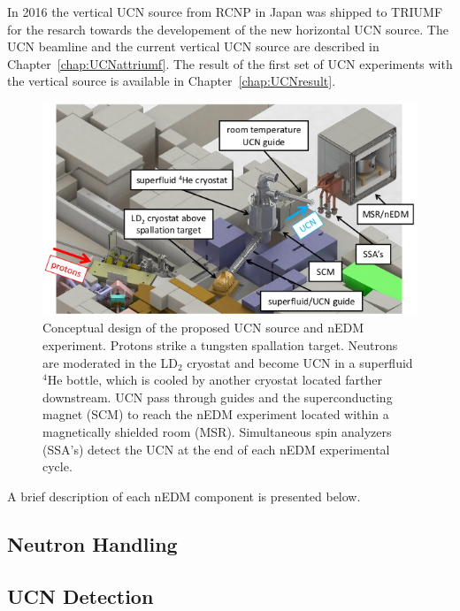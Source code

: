 In 2016 the vertical UCN source from RCNP in Japan was shipped to TRIUMF for
the resarch towards the developement of the new horizontal UCN source.
The UCN beamline and the current vertical UCN source
are described in Chapter~\ref{chap:UCNattriumf}. The result of the
first set of UCN experiments with the vertical source is available in
Chapter~\ref{chap:UCNresult}.

\begin{figure}[h]
  \centering
  \includegraphics[width=1.0\textwidth]{edmtriumf.png}
  \caption{Conceptual design of the proposed UCN source and nEDM
    experiment. Protons strike a tungsten spallation target. Neutrons
    are moderated in the LD$_2$ cryostat and become UCN in a
    superfluid $^4$He bottle, which is cooled by another cryostat
    located farther downstream. UCN pass through guides and the
    superconducting magnet (SCM) to reach the nEDM experiment located
    within a magnetically shielded room (MSR). Simultaneous spin
    analyzers (SSA’s) detect the UCN at the end of each nEDM
    experimental cycle.  }
  \label{fig:triumfEDM}
\end{figure}

A brief description of each nEDM component is presented below.

\subsection{Neutron Handling}
\subsection{UCN Detection}








